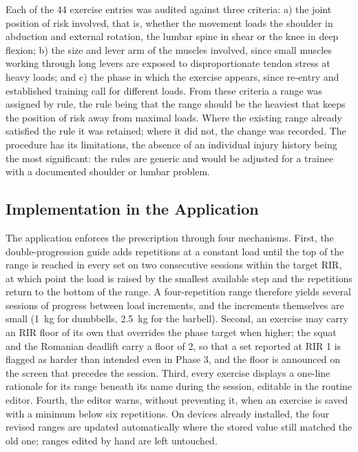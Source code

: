 \documentclass[11pt,a4paper]{article}
\begin{document}
Each of the 44 exercise entries was audited against three criteria: a) the joint position of risk involved, that is, whether the movement loads the shoulder in abduction and external rotation, the lumbar spine in shear or the knee in deep flexion; b) the size and lever arm of the muscles involved, since small muscles working through long levers are exposed to disproportionate tendon stress at heavy loads; and c) the phase in which the exercise appears, since re-entry and established training call for different loads. From these criteria a range was assigned by rule, the rule being that the range should be the heaviest that keeps the position of risk away from maximal loads. Where the existing range already satisfied the rule it was retained; where it did not, the change was recorded. The procedure has its limitations, the absence of an individual injury history being the most significant: the rules are generic and would be adjusted for a trainee with a documented shoulder or lumbar problem.

\subsection*{Implementation in the Application}

The application enforces the prescription through four mechanisms. First, the double-progression guide adds repetitions at a constant load until the top of the range is reached in every set on two consecutive sessions within the target RIR, at which point the load is raised by the smallest available step and the repetitions return to the bottom of the range. A four-repetition range therefore yields several sessions of progress between load increments, and the increments themselves are small (1~kg for dumbbells, 2.5~kg for the barbell). Second, an exercise may carry an RIR floor of its own that overrides the phase target when higher; the squat and the Romanian deadlift carry a floor of 2, so that a set reported at RIR 1 is flagged as harder than intended even in Phase 3, and the floor is announced on the screen that precedes the session. Third, every exercise displays a one-line rationale for its range beneath its name during the session, editable in the routine editor. Fourth, the editor warns, without preventing it, when an exercise is saved with a minimum below six repetitions. On devices already installed, the four revised ranges are updated automatically where the stored value still matched the old one; ranges edited by hand are left untouched.
\end{document}
